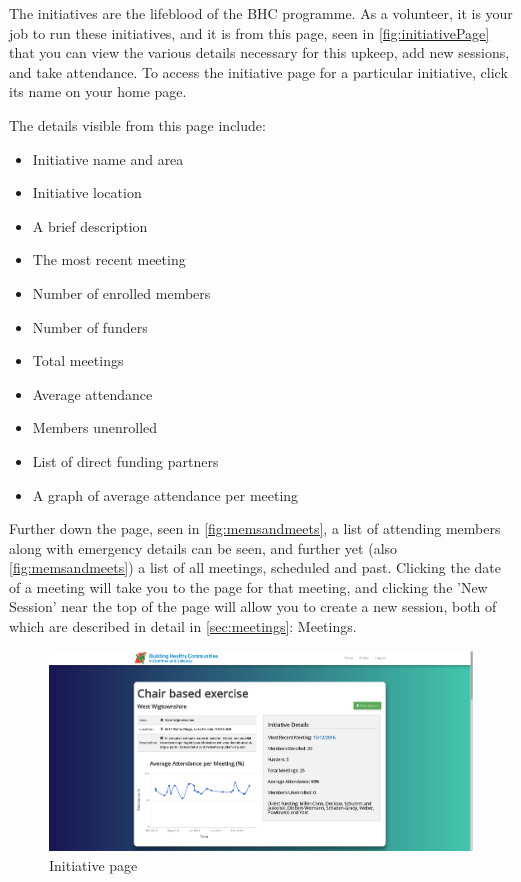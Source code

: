 \documentclass{bhcguides}
\begin{document}
The initiatives are the lifeblood of the BHC programme. As a volunteer, it is your job to run these initiatives, and it is from this page, seen in \autoref{fig:initiativePage} that you can view the various details necessary for this upkeep, add new sessions, and take attendance. To access the initiative page for a particular initiative, click its name on your home page.

The details visible from this page include:
\begin{itemize}
	\item Initiative name and area
	\item Initiative location
	\item A brief description
	\item The most recent meeting
	\item Number of enrolled members
	\item Number of funders
	\item Total meetings
	\item Average attendance
	\item Members unenrolled
	\item List of direct funding partners
	\item A graph of average attendance per meeting
\end{itemize}

 Further down the page, seen in \autoref{fig:memsandmeets}, a list of attending members along with emergency details can be seen, and further yet (also \autoref{fig:memsandmeets}) a list of all meetings, scheduled and past. Clicking the date of a meeting will take you to the page for that meeting, and clicking the 'New Session' near the top of the page will allow you to create a new session, both of which are described in detail in \autoref{sec:meetings}: Meetings.

\begin{figure}[h]
 \centerline{\includegraphics[width=\textwidth, height=\textheight, keepaspectratio]{initiativepage.png}}
 \caption{Initiative page}
 \label{fig:initiativePage}
\end{figure}
\end{document}
